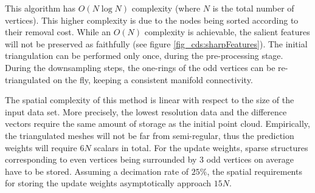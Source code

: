 \documentclass[graybox]{svmult}
\begin{document}
	This algorithm has $O(N \log N)$ complexity (where $N$ is the total number of vertices). This higher complexity is due to the 
	nodes being sorted according to their removal cost. While an $O(N)$ complexity is achievable, the salient
	features will not be preserved as faithfully (see figure \ref{fig_cds:sharpFeatures}). The initial triangulation can be performed only once, during the pre-processing stage. During the downsampling steps, the one-rings of the odd vertices can be re-triangulated on the fly, keeping a consistent manifold connectivity. 
	
	The spatial complexity of this method is linear with respect to the size of the input data set. More precisely, the lowest resolution data and the difference vectors require the same
	amount of storage as the initial point cloud. Empirically, the triangulated meshes will not be far from semi-regular, thus the prediction weights will require $6N$ scalars in total. 
	For the update weights, sparse structures corresponding to even vertices being surrounded by 3 odd vertices on average have to be stored. Assuming a decimation rate of $25\%$, the
	spatial requirements for storing the update weights asymptotically approach $15N$.
	
\end{document}
